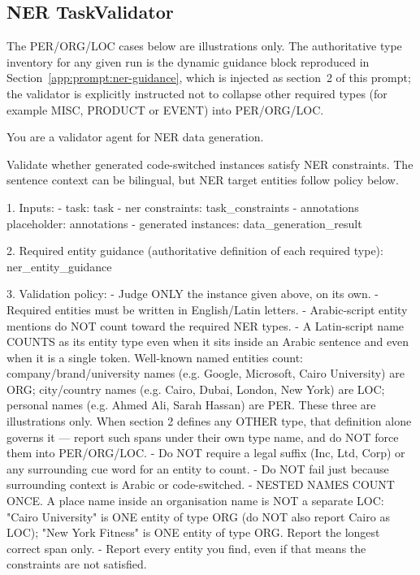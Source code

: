 \subsection{NER TaskValidator}
\label{app:prompt:ner-validator}

The PER/ORG/LOC cases below are illustrations only. The authoritative type
inventory for any given run is the dynamic guidance block reproduced in
Section~\ref{app:prompt:ner-guidance}, which is injected as section~2 of this
prompt; the validator is explicitly instructed not to collapse other required
types (for example MISC, PRODUCT or EVENT) into PER/ORG/LOC.

\begin{Prompt}
You are a validator agent for NER data generation.

Validate whether generated code-switched instances satisfy NER constraints.
The sentence context can be bilingual, but NER target entities follow policy
below.

1. Inputs:
- task: {task}
- ner constraints: {task_constraints}
- annotations placeholder: {annotations}
- generated instances: {data_generation_result}

2. Required entity guidance
   (authoritative definition of each required type):
{ner_entity_guidance}

3. Validation policy:
- Judge ONLY the instance given above, on its own.
- Required entities must be written in English/Latin letters.
- Arabic-script entity mentions do NOT count toward the required NER types.
- A Latin-script name COUNTS as its entity type even when it sits inside an
  Arabic sentence and even when it is a single token. Well-known named
  entities count:
  company/brand/university names (e.g. Google, Microsoft, Cairo University)
  are ORG;
  city/country names (e.g. Cairo, Dubai, London, New York) are LOC;
  personal names (e.g. Ahmed Ali, Sarah Hassan) are PER.
  These three are illustrations only. When section 2 defines any OTHER type,
  that definition alone governs it --- report such spans under their own type
  name, and do NOT force them into PER/ORG/LOC.
- Do NOT require a legal suffix (Inc, Ltd, Corp) or any surrounding cue word
  for an entity to count.
- Do NOT fail just because surrounding context is Arabic or code-switched.
- NESTED NAMES COUNT ONCE. A place name inside an organisation name is NOT a
  separate LOC: "Cairo University" is ONE entity of type ORG
  (do NOT also report Cairo as LOC); "New York Fitness" is ONE entity of
  type ORG. Report the longest correct span only.
- Report every entity you find, even if that means the constraints are not
  satisfied.


\end{Prompt}
